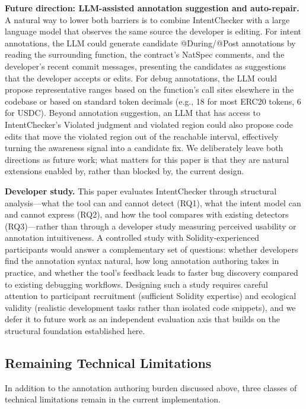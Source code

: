 \documentclass[pdflatex,sn-basic]{sn-jnl}%
\theoremstyle{thmstyleone}%
\theoremstyle{thmstyletwo}%
\theoremstyle{thmstylethree}%
\begin{document}
\smallskip
\noindent\textbf{Future direction: LLM-assisted annotation suggestion and auto-repair.}
A natural way to lower both barriers is to combine IntentChecker with a large language model that observes the same source the developer is editing.
For intent annotations, the LLM could generate candidate @During/@Post annotations by reading the surrounding function, the contract's NatSpec comments, and the developer's recent commit messages, presenting the candidates as suggestions that the developer accepts or edits.
For debug annotations, the LLM could propose representative ranges based on the function's call sites elsewhere in the codebase or based on standard token decimals (e.g., 18 for most ERC20 tokens, 6 for USDC).
Beyond annotation suggestion, an LLM that has access to IntentChecker's Violated judgment and violated region could also propose code edits that move the violated region out of the reachable interval, effectively turning the awareness signal into a candidate fix.
We deliberately leave both directions as future work; what matters for this paper is that they are natural extensions enabled by, rather than blocked by, the current design.

\smallskip
\noindent\textbf{Developer study.}
This paper evaluates IntentChecker through structural analysis---what the tool can and cannot detect (RQ1), what the intent model can and cannot express (RQ2), and how the tool compares with existing detectors (RQ3)---rather than through a developer study measuring perceived usability or annotation intuitiveness.
A controlled study with Solidity-experienced participants would answer a complementary set of questions: whether developers find the annotation syntax natural, how long annotation authoring takes in practice, and whether the tool's feedback leads to faster bug discovery compared to existing debugging workflows.
Designing such a study requires careful attention to participant recruitment (sufficient Solidity expertise) and ecological validity (realistic development tasks rather than isolated code snippets), and we defer it to future work as an independent evaluation axis that builds on the structural foundation established here.

\subsection{Remaining Technical Limitations}\label{sec:disc:tech}

In addition to the annotation authoring burden discussed above, three classes of technical limitations remain in the current implementation.
\end{document}
